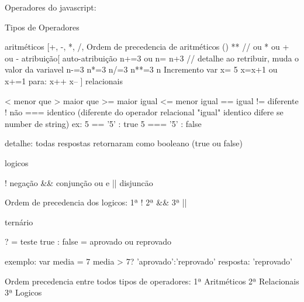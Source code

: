 Operadores do javascript:

Tipos de Operadores{
    aritméticos [+, -, *, /, %
    Ordem de precedencia de aritméticos{
        ()
        **
        // ou * ou %
        + ou -
    }
    atribuição[
        auto-atribuição {
            n+=3 ou n= n+3 // detalhe ao retribuir, muda o valor da variavel
            n-=3
            n*=3
            n/=3
            n**=3
            n%
        } 
        Incremento{
            var x= 5
            x=x+1 ou x+=1
            para:
            x++
            x--
        }
    ]
    relacionais{
        < menor que
        > maior que
        >= maior igual
        <= menor igual 
        == igual
        != diferente
        ! não
        === identico (diferente do operador relacional "igual" identico difere se number de string){
            ex:
            5 == '5' : true
            5 === '5' : false
        }

        detalhe: todas respostas retornaram como booleano (true ou false)
    }
    logicos {
        ! negação
        && conjunção ou e 
        || disjuncäo

        Ordem de precedencia dos logicos:
        1ª !
        2ª &&
        3ª ||
    }
    ternário{
        ? = teste
        true : false = aprovado ou reprovado

        exemplo: 
        var media = 7
        media > 7? 'aprovado':'reprovado'
        resposta: 'reprovado'
    }

    Ordem precedencia entre todos tipos de operadores:
    1ª Aritméticos
    2ª Relacionais
    3ª Logicos
    

}